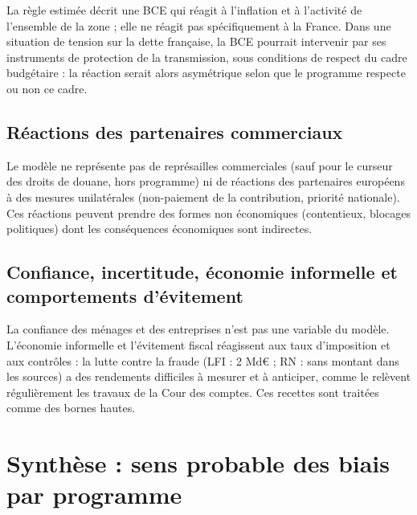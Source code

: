 \documentclass[
  11pt,
  11pt,
  a4paper,
  openany]{book}
\begin{document}
La règle estimée décrit une BCE qui réagit à l'inflation et à l'activité
de l'ensemble de la zone ; elle ne réagit pas spécifiquement à la
France. Dans une situation de tension sur la dette française, la BCE
pourrait intervenir par ses instruments de protection de la
transmission, sous conditions de respect du cadre budgétaire : la
réaction serait alors asymétrique selon que le programme respecte ou non
ce cadre.

\hypertarget{ruxe9actions-des-partenaires-commerciaux}{%
\subsection{Réactions des partenaires
commerciaux}\label{ruxe9actions-des-partenaires-commerciaux}}

Le modèle ne représente pas de représailles commerciales (sauf pour le
curseur des droits de douane, hors programme) ni de réactions des
partenaires européens à des mesures unilatérales (non-paiement de la
contribution, priorité nationale). Ces réactions peuvent prendre des
formes non économiques (contentieux, blocages politiques) dont les
conséquences économiques sont indirectes.

\hypertarget{confiance-incertitude-uxe9conomie-informelle-et-comportements-duxe9vitement}{%
\subsection{Confiance, incertitude, économie informelle et comportements
d'évitement}\label{confiance-incertitude-uxe9conomie-informelle-et-comportements-duxe9vitement}}

La confiance des ménages et des entreprises n'est pas une variable du
modèle. L'économie informelle et l'évitement fiscal réagissent aux taux
d'imposition et aux contrôles : la lutte contre la fraude (LFI : 2 Md€ ;
RN : sans montant dans les sources) a des rendements difficiles à
mesurer et à anticiper, comme le relèvent régulièrement les travaux de
la Cour des comptes. Ces recettes sont traitées comme des bornes hautes.

\hypertarget{sec:synthese-biais}{%
\section{Synthèse : sens probable des biais par
programme}\label{sec:synthese-biais}}
\end{document}
